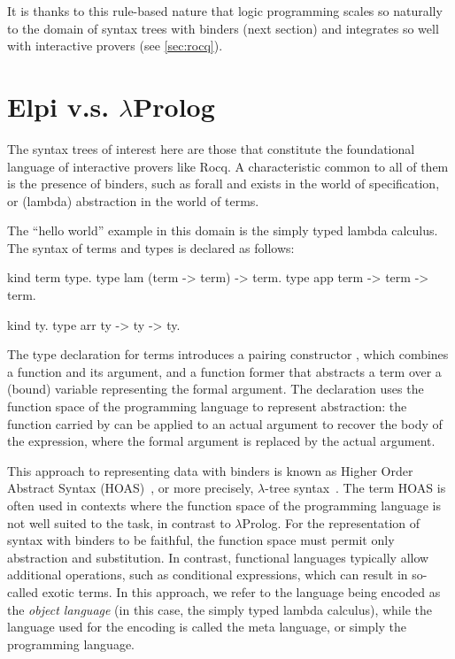 \documentclass[a4paper, 11pt]{book}
\begin{document}
It is thanks to this rule-based nature that logic programming scales so
naturally to the domain of syntax trees with binders (next section) and
integrates so well with interactive provers (see \cref{sec:rocq}).

\section{Elpi v.s. $\lambda$Prolog}\label{sec:hello}


The syntax trees of interest here are those that constitute the foundational
language of interactive provers like Rocq. A characteristic common to all of
them is the presence of binders, such as forall and exists in the world of
specification, or (lambda) abstraction in the world of terms.

The ``hello world'' example in this domain is the simply typed lambda
calculus. %
The syntax of terms and types is declared as follows:

\begin{elpicode}
kind term type.
type lam (term -> term) -> term.
type app term -> term -> term.

kind ty.
type arr ty -> ty -> ty.
\end{elpicode}

The type declaration for terms introduces a pairing constructor ,
which combines a function and its argument, and a function former 
that abstracts a term over a (bound) variable representing the formal
argument. The declaration uses the function space of the programming language
to represent abstraction: the function carried by  can be applied to
an actual argument to recover the body of the expression, where the formal
argument is replaced by the actual argument.

This approach to representing data with binders is known as Higher Order
Abstract Syntax (HOAS)~\cite{10.1145/960116.54010}, or more precisely,
$\lambda$-tree syntax~\cite{Miller2018MechanizedMR}. The term HOAS is often
used in contexts where the function space of the programming language is not
well suited to the task, in contrast to $\lambda$Prolog. For the representation
of syntax with binders to be faithful, the function space must permit only
abstraction and substitution. In contrast, functional languages typically allow
additional operations, such as conditional expressions, which can result
in so-called exotic terms. In this approach, we refer to the language being
encoded as the \emph{object language} (in this case, the simply typed lambda
calculus), while the language used for the encoding is called the meta language,
or simply the programming language.
\end{document}
